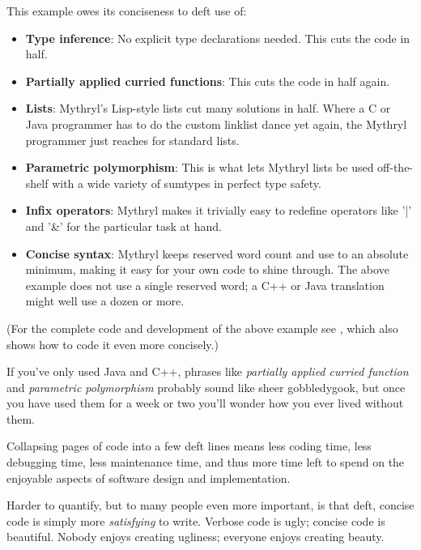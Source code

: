 This example owes its conciseness to deft use of: 

\begin{itemize}
\item {\bf Type inference}:  No explicit type declarations needed. This cuts the code in half. 
\item {\bf Partially applied curried functions}:  This cuts the code in half again. 
\item {\bf Lists}:  Mythryl's Lisp-style lists cut many solutions in half.
                    Where a C or Java programmer has to do the custom linklist dance 
                    yet again, the Mythryl programmer just reaches for standard lists. 
\item {\bf Parametric polymorphism}:  This is what lets Mythryl lists be used off-the-shelf 
                    with a wide variety of sumtypes in perfect type safety. 
\item {\bf Infix operators}:  Mythryl makes it trivially easy to redefine operators 
                    like '|' and '\&' for the particular task at hand.  
\item {\bf Concise syntax}:  Mythryl keeps reserved word count and use to an 
                    absolute minimum, making it easy for your own code to shine through. 
                    The above example does not use a single reserved word;  a C++ or Java translation 
                    might well use a dozen or more. 
\end{itemize}

(For the complete code and development of the above example 
see , which 
also shows how to code it even more concisely.)

If you've only used Java and C++, phrases like {\it partially applied curried function} 
and {\it parametric polymorphism} probably sound like sheer gobbledygook, but once you 
have used them for a week or two you'll wonder how you ever lived without them.

Collapsing pages of code into a few deft lines means less coding time, 
less debugging time, less maintenance time, and thus more time left to spend 
on the enjoyable aspects of software design and implementation.

Harder to quantify, but to many people even more important, is that 
deft, concise code is simply more {\it satisfying} to write.  Verbose 
code is ugly; concise code is beautiful.  Nobody enjoys creating 
ugliness; everyone enjoys creating beauty.

